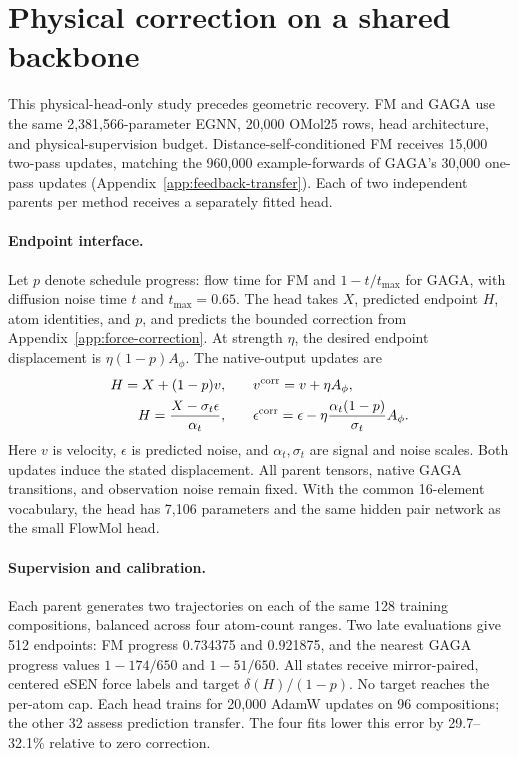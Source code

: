 \section{Physical correction on a shared backbone}\label{app:matched-connection}
This physical-head-only study precedes geometric recovery. FM and GAGA use the same 2,381,566-parameter EGNN, 20,000 OMol25 rows, head architecture, and physical-supervision budget. Distance-self-conditioned FM receives 15,000 two-pass updates, matching the 960,000 example-forwards of GAGA's 30,000 one-pass updates (Appendix~\ref{app:feedback-transfer}). Each of two independent parents per method receives a separately fitted head.

\paragraph{Endpoint interface.}
Let $p$ denote schedule progress: flow time for FM and $1-t/t_{\max}$ for GAGA, with diffusion noise time $t$ and $t_{\max}=0.65$. The head takes $X$, predicted endpoint $H$, atom identities, and $p$, and predicts the bounded correction from Appendix~\ref{app:force-correction}. At strength $\eta$, the desired endpoint displacement is $\eta(1-p)A_\phi$. The native-output updates are
\begin{align}
 H=X+(1-p)v,
 &\qquad v^{\rm corr}=v+\eta A_\phi,
 \label{eq:matched-fm-correction}\\
 H=\frac{X-\sigma_t\epsilon}{\alpha_t},
 &\qquad \epsilon^{\rm corr}=\epsilon
       -\eta\frac{\alpha_t(1-p)}{\sigma_t}A_\phi.
 \label{eq:matched-gaga-correction}
\end{align}
Here $v$ is velocity, $\epsilon$ is predicted noise, and $\alpha_t,\sigma_t$ are signal and noise scales. Both updates induce the stated displacement. All parent tensors, native GAGA transitions, and observation noise remain fixed. With the common 16-element vocabulary, the head has 7,106 parameters and the same hidden pair network as the small FlowMol head.

\paragraph{Supervision and calibration.}
Each parent generates two trajectories on each of the same 128 training compositions, balanced across four atom-count ranges. Two late evaluations give 512 endpoints: FM progress 0.734375 and 0.921875, and the nearest GAGA progress values $1-174/650$ and $1-51/650$. All states receive mirror-paired, centered eSEN force labels and target $\delta(H)/(1-p)$. No target reaches the per-atom cap. Each head trains for 20,000 AdamW updates on 96 compositions; the other 32 assess prediction transfer. The four fits lower this error by 29.7--32.1\% relative to zero correction.

